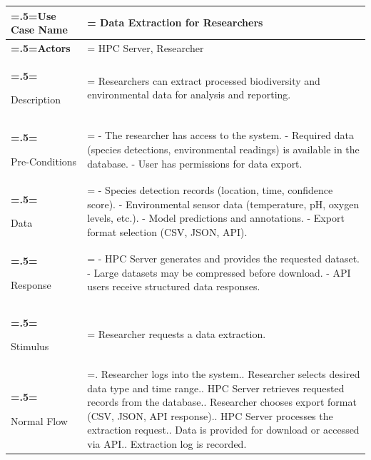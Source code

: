 \begin{table}[H] 
  \centering
  \small
  \begin{tabularx}{\textwidth}{|>{\bfseries\hsize=.5\hsize\linewidth=\hsize}X|
  >{\hsize=1.5\hsize\linewidth=\hsize}X|}
  \hline
  Use Case Name       & Data Extraction for Researchers \\ \hline
  
  Actors              & HPC Server, Researcher \\ \hline
  
  Description         & Researchers can extract processed biodiversity and environmental data for analysis and reporting. \\ \hline
  
  Pre-Conditions      & 
  - The researcher has access to the system.\newline
  - Required data (species detections, environmental readings) is available in the database.\newline
  - User has permissions for data export. \\ \hline
  
  Data                & 
  - Species detection records (location, time, confidence score).\newline
  - Environmental sensor data (temperature, pH, oxygen levels, etc.).\newline
  - Model predictions and annotations.\newline
  - Export format selection (CSV, JSON, API). \\ \hline
  
  Response            & 
  - HPC Server generates and provides the requested dataset.\newline
  - Large datasets may be compressed before download.\newline
  - API users receive structured data responses. \\ \hline
  
  Stimulus            & Researcher requests a data extraction. \\ \hline
  
  Normal Flow         & 
  1. Researcher logs into the system.\newline
  2. Researcher selects desired data type and time range.\newline
  3. HPC Server retrieves requested records from the database.\newline
  4. Researcher chooses export format (CSV, JSON, API response).\newline
  5. HPC Server processes the extraction request.\newline
  6. Data is provided for download or accessed via API.\newline
  7. Extraction log is recorded. \\ \hline
  

\end{tabularx}
\end{table}
